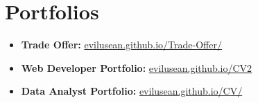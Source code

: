 \section{Portfolios}

\begin{itemize}
  \item \textbf{Trade Offer:} \url{evilusean.github.io/Trade-Offer/}
  \item \textbf{Web Developer Portfolio:} \url{evilusean.github.io/CV2}
  \item \textbf{Data Analyst Portfolio:} \url{evilusean.github.io/CV/}
\end{itemize}